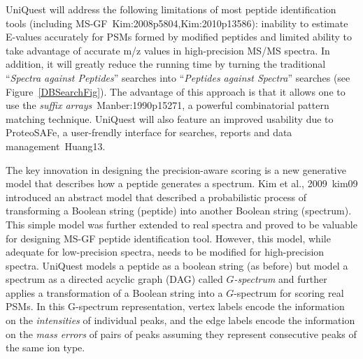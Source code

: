 UniQuest will address the following limitations of most peptide identification tools (including MS-GF~\cite{unv}{Kim:2008p5804,Kim:2010p13586}):
inability to estimate E-values accurately for PSMs formed by modified peptides and
limited ability to take advantage of accurate m/z values in  high-precision MS/MS spectra.
In addition, it will greatly reduce the  running time by  turning the traditional ``{\em Spectra against Peptides}''  searches into ``{\em Peptides against Spectra}'' searches 
(see Figure~\ref{DBSearchFig}). 
The advantage of this approach is that it allows one to use the {\em suffix arrays}~\cite{unv}{Manber:1990p15271}, a powerful combinatorial pattern matching technique.  
 UniQuest will also feature an improved usability
due to ProteoSAFe, a user-frendly interface for searches, reports and data management~\cite{unv}{Huang13}. 

The key innovation in designing the precision-aware scoring is a new generative model that describes how a peptide generates a spectrum. 
Kim et al., 2009~\cite{unv}{kim09} introduced an abstract model 
that described a probabilistic process of transforming a Boolean string (peptide) into another Boolean string (spectrum). This simple model was further extended to real spectra and proved to be valuable for designing MS-GF peptide identification tool. 
However, this model, while adequate for low-precision spectra, needs to be modified for high-precision spectra.
UniQuest models a peptide as a boolean string (as before) but model a spectrum as a directed acyclic graph (DAG) called 
{\em $G$-spectrum}  and further applies a transformation of a Boolean string into a $G$-spectrum for scoring real PSMs.
In this G-spectrum representation, 
vertex labels encode the information on the {\em intensities} of individual peaks,
and the edge labels encode the information on the {\em mass errors} of pairs of peaks assuming they represent consecutive peaks of the same ion type.

